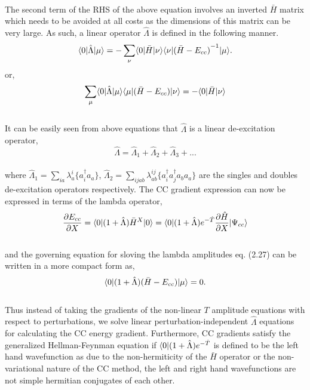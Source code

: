 \\
The second term of the RHS of the above equation involves an inverted 
$\bar{H}$ matrix which needs to be avoided at all costs as the dimensions
of this matrix can be very large. As such, a linear operator $\hat{\Lambda}$
is defined in the following manner.
\\
\begin{equation}
\langle 0 |\hat{\Lambda}| \mu \rangle = -\sum_{\nu}\langle 0 |\bar{H}| \nu \rangle
\langle \nu |{(\bar{H}-E_{cc})}^{-1}| \mu \rangle.
\end{equation}
or, 
\begin{equation}
\sum_{\mu}\langle 0 |\hat{\Lambda}| \mu \rangle\langle \mu |{(\bar{H}-E_{cc})}| \nu \rangle
 = - \langle 0 |\bar{H}| \nu \rangle
\end{equation}
\\
It can be easily seen from above equations that $\hat{\Lambda}$ is a linear de-excitation operator,
\begin{equation}
\hat{\Lambda} = \hat{\Lambda}_1 + \hat{\Lambda}_2 + \hat{\Lambda}_3 + ...
\end{equation} 
\\
where $\hat{\Lambda}_1 = \sum\limits_{ia}\lambda^i_a\{{a}^\dagger_i a_a\}$, $\hat{\Lambda}_2=\sum\limits_{ijab}
\lambda^{ij}_{ab}\{{a}^\dagger_i {a}^\dagger_j a_b a_a\}$ 
are the singles and doubles de-excitation operators respectively. The CC gradient expression can now be expressed 
in terms of the lambda operator,
\\
\begin{equation}
\frac{\partial{E_{cc}}}{\partial X} = \langle 0 |(1 + \hat{\Lambda}){\bar{H}}^X| 0 \rangle = \langle 0 |(1 + \hat{\Lambda})e^{-\hat{T}}\frac{\partial{\hat H}}{\partial X}| \Psi_{cc} \rangle
\end{equation}
\\
and the governing equation for sloving the lambda amplitudes eq. (2.27) can be written in a more compact form as,
\\
\begin{equation}
\langle 0 |(1 + \hat{\Lambda})(\bar{H} - E_{cc})| \mu \rangle = 0.
\end{equation}
\\
Thus instead of taking the gradients of the non-linear $T$ amplitude
equations with respect to perturbations, we solve linear perturbation-independent 
$\hat{\Lambda}$ equations for calculating the CC energy gradient.
Furthermore, CC gradients satisfy the generalized Hellman-Feynman equation\cite{Feynman39}
if $\langle 0 |(1 + \hat{\Lambda})e^{-\hat{T}}$ is defined to be the left hand wavefunction
as due to the non-hermiticity of the $\bar{H}$ operator or the non-variational nature of the 
CC method, the left and right hand wavefunctions are not simple hermitian conjugates of each other.

